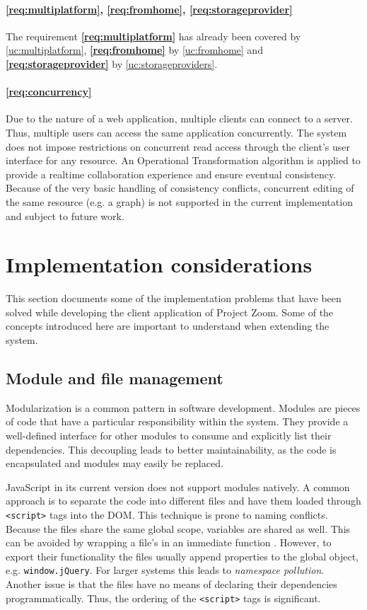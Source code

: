 \paragraph{\ref{req:multiplatform}, \ref{req:fromhome}, \ref{req:storageprovider}} The requirement \textbf{\ref{req:multiplatform}} has already been covered by \ref{uc:multiplatform}, \textbf{\ref{req:fromhome}} by \ref{uc:fromhome} and \textbf{\ref{req:storageprovider}} by \ref{uc:storageproviders}.

\paragraph{\ref{req:concurrency}} Due to the nature of a web application, multiple clients can connect to a server. Thus, multiple users can access the same application concurrently. The system does not impose restrictions on concurrent read access through the client's user interface for any resource. An Operational Transformation algorithm is applied to provide a realtime collaboration experience and ensure eventual consistency. Because of the very basic handling of consistency conflicts, concurrent editing of the same resource (e.g. a graph) is not supported in the current implementation and subject to future work.

\section{Implementation considerations}

This section documents some of the implementation problems that have been solved while developing the client application of Project Zoom. Some of the concepts introduced here are important to understand when extending the system.

\subsection{Module and file management}
Modularization is a common pattern in software development. Modules are pieces of code that have a particular responsibility within the system. They provide a well-defined interface for other modules to consume and explicitly list their dependencies. This decoupling leads to better maintainability, as the code is encapsulated and modules may easily be replaced. \cite{Osmani_2011}

JavaScript in its current version does not support modules natively. A common approach is to separate the code into different files and have them loaded through \texttt{<script>} tags into the DOM. This technique is prone to naming conflicts. Because the files share the same global scope, variables are shared as well. This can be avoided by wrapping a file's in an immediate function \cite{Resig_2013}. However, to export their functionality the files usually append properties to the global object, e.g. \texttt{window.jQuery}. For larger systems this leads to \textit{namespace pollution}. Another issue is that the files have no means of declaring their dependencies programmatically. Thus, the ordering of the \texttt{<script>} tags is significant.

